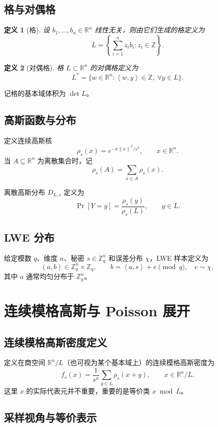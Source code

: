 \documentclass[12pt,a4paper]{ctexart}
\newtheorem{definition}{定义}[section]
\newcommand{\R}{\mathbb{R}}
\newcommand{\Z}{\mathbb{Z}}
\newcommand{\dual}{^{*}}
\newcommand{\ip}[2]{\left\langle #1,#2\right\rangle}
\newcommand{\norm}[1]{\left\lVert #1\right\rVert}
\begin{document}
\subsection{格与对偶格}

\begin{definition}[格]
设 \(b_1,\dots,b_n\in \R^n\) 线性无关，则由它们生成的格定义为
\[
L=\left\{\sum_{i=1}^n z_i b_i: z_i\in \Z\right\}.
\]
\end{definition}

\begin{definition}[对偶格]
格 \(L\subset \R^n\) 的对偶格定义为
\[
L\dual=\{w\in \R^n:\ip{w}{y}\in \Z,\ \forall y\in L\}.
\]
\end{definition}

记格的基本域体积为 \(\det L\)。

\subsection{高斯函数与分布}

定义连续高斯核
\[
\rho_s(x)=e^{-\pi \norm{x}^2/s^2},\qquad x\in \R^n.
\]
当 \(A\subseteq \R^n\) 为离散集合时，记
\[
\rho_s(A)=\sum_{x\in A}\rho_s(x).
\]

离散高斯分布 \(D_{L,s}\) 定义为
\[
\Pr[Y=y]=\frac{\rho_s(y)}{\rho_s(L)},\qquad y\in L.
\]

\subsection{LWE 分布}

给定模数 \(q\)、维度 \(n\)、秘密 \(s\in \Z_q^n\) 和误差分布 \(\chi\)，LWE 样本定义为
\[
(a,b)\in \Z_q^n\times \Z_q,\qquad
b=\ip{a}{s}+e \pmod q,\quad e\sim \chi,
\]
其中 \(a\) 通常均匀分布于 \(\Z_q^n\)。

\section{连续模格高斯与 Poisson 展开}

\subsection{连续模格高斯密度定义}

定义在商空间 \(\R^n/L\)（也可视为某个基本域上）的连续模格高斯密度为
\[
f_s(x)=\frac{1}{s^n}\sum_{y\in L}\rho_s(x+y),\qquad x\in \R^n/L.
\]
这里 \(x\) 的实际代表元并不重要，重要的是等价类 \(x\bmod L\)。

\subsection{采样视角与等价表示}
\end{document}
